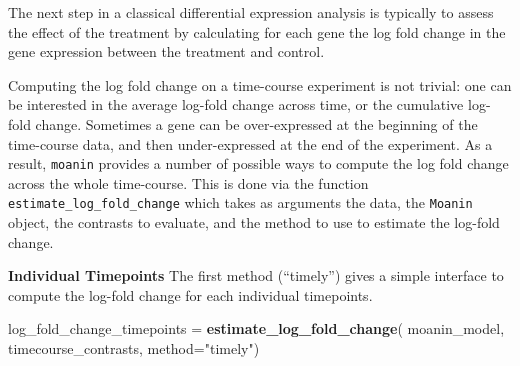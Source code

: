\documentclass[9pt,a4paper,]{extarticle}
\newenvironment{Shaded}{\begin{snugshade}}{\end{snugshade}}
\newcommand{\DataTypeTok}[1]{\textcolor[rgb]{0.13,0.29,0.53}{#1}}
\newcommand{\KeywordTok}[1]{\textcolor[rgb]{0.13,0.29,0.53}{\textbf{#1}}}
\newcommand{\NormalTok}[1]{#1}
\newcommand{\StringTok}[1]{\textcolor[rgb]{0.31,0.60,0.02}{#1}}
\begin{document}
The next step in a classical differential expression analysis is typically to
assess the effect of the treatment by calculating for each gene the log fold change in the gene expression between the treatment and control.

Computing the log fold change on a time-course experiment is not trivial: one
can be interested in the average log-fold change across time, or the
cumulative log-fold change. Sometimes a gene can be over-expressed at the
beginning of the time-course data, and then under-expressed at the end of the
experiment. As a result, \texttt{moanin} provides a number of possible ways to
compute the log fold change across the whole time-course. This is done via the function \texttt{estimate\_log\_fold\_change} which takes as
arguments the data, the \texttt{Moanin} object, the contrasts to evaluate, and the method to use to estimate the log-fold change.

\textbf{Individual Timepoints} The first method (``timely'') gives a simple interface to compute the log-fold change
for each individual timepoints.

\begin{Shaded}
\begin{Highlighting}[]
\NormalTok{log_fold_change_timepoints =}\StringTok{ }\KeywordTok{estimate_log_fold_change}\NormalTok{(}
\NormalTok{    moanin_model, timecourse_contrasts,  }\DataTypeTok{method=}\StringTok{"timely"}\NormalTok{)}
\end{Highlighting}
\end{Shaded}
\end{document}
